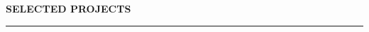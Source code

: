 \documentclass[10pt]{article}
\begin{document}
		
		

		
		
			
		\vspace{2mm}
			 
		
	
		
		
		
		\vspace{-2mm}
		
		
		
		\vspace{2mm}
		
		\noindent \textbf{\color{violet} SELECTED PROJECTS}
		
		\vspace{-2mm}
		
		\noindent\rule[0.5ex]{\linewidth}{1pt}
		
\end{document}
